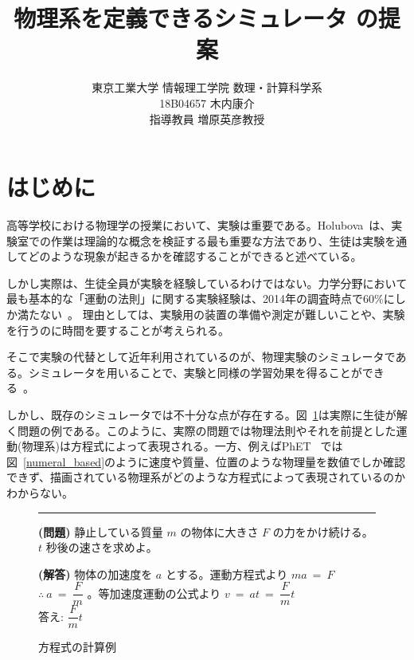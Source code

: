\documentclass[11pt, a4paper, oneside, twocolumn, dvipdfmx]{jsarticle}
\title{物理系を定義できるシミュレータ \simname の提案}
\author{東京工業大学 情報理工学院 数理・計算科学系\\18B04657 木内康介\\指導教員 増原英彦教授}
\date{}
\begin{document}
\maketitle

\section{はじめに} \label{intro}
高等学校における物理学の授業において、実験は重要である。Holubova~\cite{holubova_2019}は、実験室での作業は理論的な概念を検証する最も重要な方法であり、生徒は実験を通してどのような現象が起きるかを確認することができると述べている。

しかし実際は、生徒全員が実験を経験しているわけではない。力学分野において最も基本的な「運動の法則」に関する実験経験は、2014年の調査時点で60\%にしか満たない~\cite{2015KJ00010038066}。
理由としては、実験用の装置の準備や測定が難しいことや、実験を行うのに時間を要することが考えられる。

そこで実験の代替として近年利用されているのが、物理実験のシミュレータである。シミュレータを用いることで、実験と同様の学習効果を得ることができる~\cite{ajredini_real_2014}。

しかし、既存のシミュレータでは不十分な点が存在する。図~\ref{symbol_based}は実際に生徒が解く問題の例である。このように、実際の問題では物理法則やそれを前提とした運動(物理系)は方程式によって表現される。一方、例えばPhET~\cite{perkins_phet_2006} では図~\ref{numeral_based}のように速度や質量、位置のような物理量を数値でしか確認できず、描画されている物理系がどのような方程式によって表現されているのかわからない。

\begin{figure}[b]
\noindent\rule{\linewidth}{0.4pt}

\small{\textbf{(問題)} 静止している質量 $m$ の物体に大きさ $F$ の力をかけ続ける。$t$ 秒後の速さを求めよ。}

\small{\textbf{(解答)} 物体の加速度を $a$ とする。運動方程式より $ma~=~F$ $\therefore~a~=~\dfrac{F}{m}$ 。等加速度運動の公式より $v~=~at~=~\dfrac{F}{m}t$\\
答え: $\dfrac{F}{m}t$}

\caption{方程式の計算例} \label{symbol_based}
\end{figure}
\end{document}
